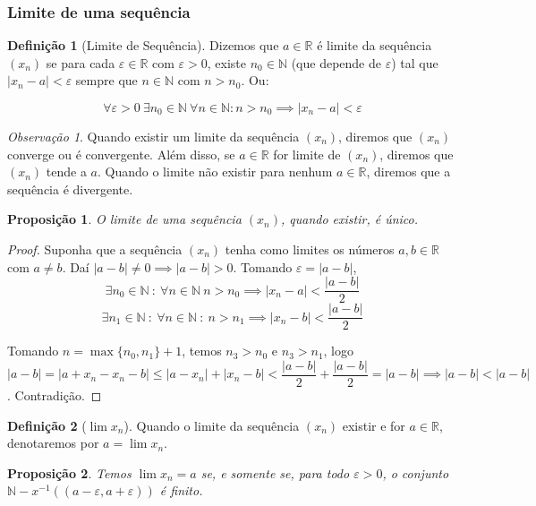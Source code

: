 \documentclass{article}
\theoremstyle{plain}
\newtheorem{prop}{Proposição}[section]
\theoremstyle{definition}
\newtheorem{definicao}{Definição}[section]
\theoremstyle{remark}
\newtheorem{obs}{Observação}[section]
\begin{document}
   \subsubsection{ Limite de uma sequência}
   \begin{definicao}[Limite de Sequência]
	   Dizemos que $a\in \mathbb{R}$ é limite da sequência $(x_n)$ se para cada $\varepsilon\in \mathbb{R}$ com $\varepsilon > 0$, existe $n_0 \in \mathbb{N}$ (que depende de $\varepsilon$) tal que $|x_n - a| < \varepsilon$ sempre que $n\in \mathbb{N}$ com $n>n_0$. Ou:

	   $$ \forall \varepsilon >0 \:  \exists n_0 \in \mathbb{N}\: \forall n \in \mathbb{N} : n> n_0 \implies |x_n -a| < \varepsilon$$
   \end{definicao}
   \begin{obs}
	   Quando existir um limite da sequência $(x_n)$, diremos que $(x_n)$ converge ou é convergente. Além disso, se $a\in \mathbb{R}$ for limite de $(x_n)$, diremos que $(x_n)$ tende a $a$. 
	   Quando o limite não existir para nenhum $a\in \mathbb{R}$, diremos que a sequência é divergente.
   \end{obs}
   \begin{prop}
	   O limite de uma sequência $(x_n)$, quando existir, é único.
   \end{prop}
   \begin{proof}
	   Suponha que a sequência $(x_n)$ tenha como limites os números $a,b\in \mathbb{R}$ com $a\neq b$. Daí $|a-b| \neq 0 \implies |a-b| > 0$. Tomando $\varepsilon = |a-b|$, 
	   $$ \exists n_0\in \mathbb{N} \: : \: \forall n \in \mathbb{N} \: n > n_0 \implies |x_n - a| < \dfrac{|a-b|}{2}$$ 
	   $$ \exists n_1 \in \mathbb{N} \: : \: \forall n \in \mathbb{N} \: : \: n > n_1 \implies |x_n -b| < \dfrac{|a-b|}{2}$$

	   Tomando $n = \max\{n_0 , n_1\} +1$, temos $n_3>n_0$ e $n_3 > n_1$, logo $|a-b| = |a+x_{n} -x_n -b | \leq |a-x_n| + |x_n - b|< \dfrac{|a-b|}{2} + \dfrac{|a-b|}{2}  = |a-b| \implies |a-b| < |a-b|$. Contradição.
   \end{proof}
   \begin{definicao}[$\lim x_n$]
	   Quando o limite da sequência $(x_n)$ existir e for $a\in \mathbb{R}$, denotaremos por $a = \lim x_n$.
   \end{definicao}
\begin{prop}
	Temos $\lim x_n = a$ se, e somente se, para todo $\varepsilon>0$,  o conjunto $\mathbb{N} - x^{-1}( (a - \varepsilon, a+\varepsilon))$ é finito.
\end{prop}
\end{document}
